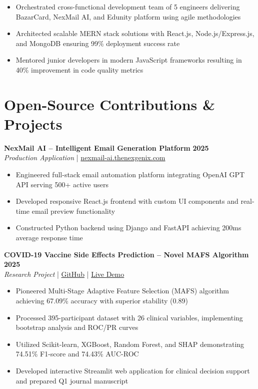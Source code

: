 \documentclass[10pt,a4paper]{article}
\begin{document}
\begin{itemize}[leftmargin=15pt, itemsep=0.5pt, parsep=0pt]
    \item Orchestrated cross-functional development team of 5 engineers delivering BazarCard, NexMail AI, and Edunity platform using agile methodologies
    \item Architected scalable MERN stack solutions with React.js, Node.js/Express.js, and MongoDB ensuring 99\% deployment success rate
    \item Mentored junior developers in modern JavaScript frameworks resulting in 40\% improvement in code quality metrics
\end{itemize}

\vspace{2pt}

\section{Open-Source Contributions \& Projects}

\textbf{NexMail AI -- Intelligent Email Generation Platform} \hfill \textbf{2025}\\
\textit{Production Application} | \href{https://nexmail-ai.thenexgenix.com/}{nexmail-ai.thenexgenix.com}

\begin{itemize}[leftmargin=15pt, itemsep=0.5pt, parsep=0pt]
    \item Engineered full-stack email automation platform integrating OpenAI GPT API serving 500+ active users
    \item Developed responsive React.js frontend with custom UI components and real-time email preview functionality
    \item Constructed Python backend using Django and FastAPI achieving 200ms average response time
\end{itemize}

\vspace{1pt}

\textbf{COVID-19 Vaccine Side Effects Prediction -- Novel MAFS Algorithm} \hfill \textbf{2025}\\
\textit{Research Project} | \href{https://github.com/Anthic/covid19-vaccine-prediction}{GitHub} | \href{https://covid19-vaccine-prediction-furyjttsea4wjtevvrhnga.streamlit.app/}{Live Demo}

\begin{itemize}[leftmargin=15pt, itemsep=0.5pt, parsep=0pt]
    \item Pioneered Multi-Stage Adaptive Feature Selection (MAFS) algorithm achieving 67.09\% accuracy with superior stability (0.89)
    \item Processed 395-participant dataset with 26 clinical variables, implementing bootstrap analysis and ROC/PR curves
    \item Utilized Scikit-learn, XGBoost, Random Forest, and SHAP demonstrating 74.51\% F1-score and 74.43\% AUC-ROC
    \item Developed interactive Streamlit web application for clinical decision support and prepared Q1 journal manuscript
\end{itemize}
\end{document}
